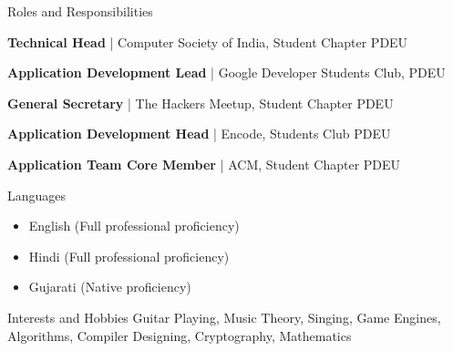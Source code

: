 \documentclass{resume}
\begin{document}
\begin{rSection}{Roles and Responsibilities}
\vspace{-1em}
\item \textbf{Technical Head} | {Computer Society of India, Student Chapter PDEU}
\item \textbf{Application Development Lead} | {Google Developer Students Club, PDEU}
\item \textbf{General Secretary} | {The Hackers Meetup, Student Chapter PDEU}
\item \textbf{Application Development Head} | {Encode, Students Club PDEU}
\item \textbf{Application Team Core Member} | {ACM, Student Chapter PDEU}
\end{rSection}

\begin{rSection}{Languages}
\begin{itemize}
    \item English (Full professional proficiency)
    \item Hindi (Full professional proficiency)
    \item Gujarati (Native proficiency)
\end{itemize}
\end{rSection}

\begin{rSection}{Interests and Hobbies}
Guitar Playing, Music Theory, Singing, Game Engines, Algorithms, Compiler Designing, Cryptography, Mathematics
\end{rSection}
\end{document}

